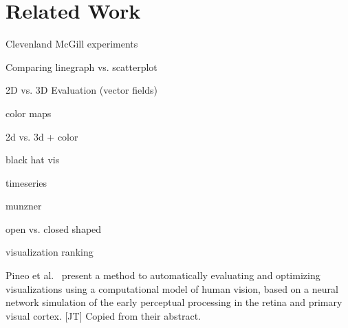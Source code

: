 \section{Related Work}

\cite{cleveland_mcgill} Clevenland McGill experiments


\cite{Wang_linegraph_vs_scatterplot} Comparing linegraph vs. scatterplot


\cite{mckenzie_2d_3d} \cite{forsberg2009comparing_3d_vector} \cite{laidlaw_2d_vector} 2D vs. 3D Evaluation (vector fields)


\cite{kindlmann2002color} \cite{rheingans1992color} \cite{ware1988color} \cite{Rogowitz2001_colormaps} color maps

2d vs. 3d + color \cite{borkin2011arteries}

black hat vis \cite{heer2017blackhat}

timeseries \cite{herr2009timeseries}

munzner \cite{munzner2015visualization}

open vs. closed shaped \cite{open_vs_closed_shapes}

visualization ranking \cite{harrison2014_webers_law_rank}

Pineo et al.~\cite{Pineo2012_computational_perception} present a method to automatically evaluating and optimizing visualizations using a computational model of human vision, based on a neural network simulation of the early perceptual processing in the retina and primary visual cortex. [JT] Copied from their abstract.

